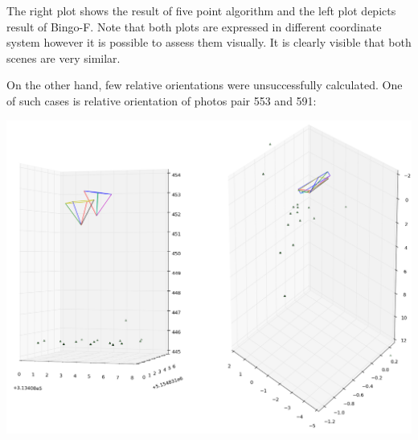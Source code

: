 \documentclass[a4paper,12pt]{article}
\begin{document}
The right plot shows the result of five point algorithm and the left plot depicts result of Bingo-F. Note that both 
plots are expressed in different coordinate system however it is possible to assess them visually. It is clearly visible
that both scenes are very similar.

On the other hand, few relative orientations were unsuccessfully calculated.  
One of such cases is relative orientation of photos pair 553 and 591:  


\includegraphics[scale=0.4]{figures/rel_or_553_591.png}
\end{document}
